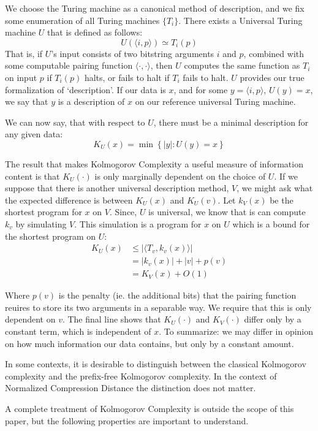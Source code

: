 \documentclass{article}
\begin{document}
We choose the Turing machine as a canonical method of description, and we fix some enumeration of all Turing machines $\{T_i\}$. There exists a Universal Turing machine $U$ that is defined as follows:
\[
U(\langle i, p\rangle) \simeq T_i(p)
\] 
That is, if $U$'s input consists of two bitstring arguments $i$ and $p$, combined with some computable pairing function $\langle \cdot, \cdot\rangle$, then $U$ computes the same function as $T_i$ on input $p$ if $T_i(p)$ halts, or fails to halt if $T_i$ fails to halt. $U$ provides our true formalization of `description'. If our data is $x$, and for some $y = \langle i, p\rangle$, $U(y) = x$, we say that $y$ is a description of $x$ on our reference universal Turing machine.  

We can now say, that with respect to $U$, there must be a minimal description for any given data:
\[
K_U(x) = \min\left \{|y| : U(y) = x\right\} 
\]

The result that makes Kolmogorov Complexity a useful measure of information content is that $K_U(\cdot)$ is only marginally dependent on the choice of $U$. If we suppose that there is another universal description method, $V$, we might ask what the expected difference is between $K_U(x)$ and $K_U(v)$. Let $k_V(x)$ be the shortest program for $x$ on $V$. Since, $U$ is universal, we know that is can compute $k_v$ by simulating $V$. This simulation is a program for $x$ on $U$ which is a bound for the shortest program on $U$:
\begin{align*}
K_U(x) 	&\leq |\langle T_v, k_v(x)\rangle|\\ 
		&=  |k_v(x)| + |v| + p(v) \\
		&=  K_V(x) + O(1)
\end{align*}

Where $p(v)$ is the penalty (ie. the additional bits) that the pairing function reuires to store its two arguments in a separable way. We require that this is only dependent on $v$. The final line shows that $K_U(\cdot)$ and $K_V(\cdot)$ differ only by a constant term, which is independent of $x$. To summarize: we may differ in opinion on how much information our data contains, but only by a constant amount.
  
In some contexts, it is desirable to distinguish between the classical Kolmogorov complexity and the prefix-free Kolmogorov complexity. In the context of Normalized Compression Distance the distinction does not matter.

A complete treatment of Kolmogorov Complexity is outside the scope of this paper, but the following properties are important to understand.
\end{document}
